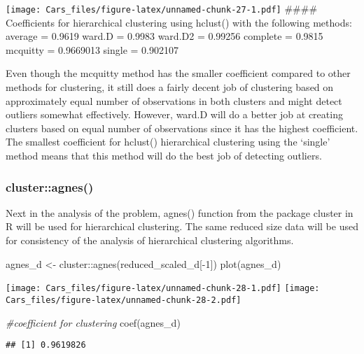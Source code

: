 \documentclass[
]{article}
\newenvironment{Shaded}{\begin{snugshade}}{\end{snugshade}}
\newcommand{\CommentTok}[1]{\textcolor[rgb]{0.56,0.35,0.01}{\textit{#1}}}
\newcommand{\DecValTok}[1]{\textcolor[rgb]{0.00,0.00,0.81}{#1}}
\newcommand{\FunctionTok}[1]{\textcolor[rgb]{0.00,0.00,0.00}{#1}}
\newcommand{\NormalTok}[1]{#1}
\newcommand{\OtherTok}[1]{\textcolor[rgb]{0.56,0.35,0.01}{#1}}
\newcommand{\SpecialCharTok}[1]{\textcolor[rgb]{0.00,0.00,0.00}{#1}}
\begin{document}
\texttt{[image: Cars\_files/figure-latex/unnamed-chunk-27-1.pdf]}
\#\#\#\# Coefficients for hierarchical clustering using hclust() with
the following methods: average = 0.9619 ward.D = 0.9983 ward.D2 =
0.99256 complete = 0.9815 mcquitty = 0.9669013 single = 0.902107

Even though the mcquitty method has the smaller coefficient compared to
other methods for clustering, it still does a fairly decent job of
clustering based on approximately equal number of observations in both
clusters and might detect outliers somewhat effectively. However, ward.D
will do a better job at creating clusters based on equal number of
observations since it has the highest coefficient. The smallest
coefficient for hclust() hierarchical clustering using the `single'
method means that this method will do the best job of detecting
outliers.

\hypertarget{clusteragnes}{%
\subsubsection{cluster::agnes()}\label{clusteragnes}}

Next in the analysis of the problem, agnes() function from the package
cluster in R will be used for hierarchical clustering. The same reduced
size data will be used for consistency of the analysis of hierarchical
clustering algorithms.

\begin{Shaded}
\begin{Highlighting}[]
\NormalTok{agnes\_d }\OtherTok{\textless{}{-}}\NormalTok{ cluster}\SpecialCharTok{::}\FunctionTok{agnes}\NormalTok{(reduced\_scaled\_d[}\SpecialCharTok{{-}}\DecValTok{1}\NormalTok{])}
\FunctionTok{plot}\NormalTok{(agnes\_d)}
\end{Highlighting}
\end{Shaded}

\texttt{[image: Cars\_files/figure-latex/unnamed-chunk-28-1.pdf]}
\texttt{[image: Cars\_files/figure-latex/unnamed-chunk-28-2.pdf]}

\begin{Shaded}
\begin{Highlighting}[]
\CommentTok{\#coefficient for clustering}
\FunctionTok{coef}\NormalTok{(agnes\_d)}
\end{Highlighting}
\end{Shaded}

\begin{verbatim}
## [1] 0.9619826
\end{verbatim}
\end{document}
